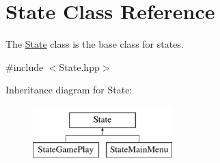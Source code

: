 \hypertarget{class_state}{\section{State Class Reference}
\label{class_state}
}


The \hyperlink{class_state}{State} class is the base class for states.  




{\ttfamily \#include $<$State.\-hpp$>$}

Inheritance diagram for State\-:\begin{figure}[H]
\begin{center}
\leavevmode
\includegraphics[height=2.000000cm]{class_state}
\end{center}
\end{figure}
